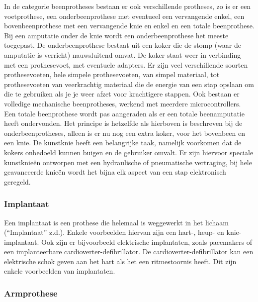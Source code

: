 In de categorie beenprotheses bestaan er ook verschillende protheses, zo
is er een voetprothese, een onderbeenprothese met eventueel een
vervangende enkel, een bovenbeenprothese met een vervangende knie en
enkel en een totale beenprothese. Bij een amputatie onder de knie wordt
een onderbeenprothese het meeste toegepast. De onderbeenprothese bestaat
uit een koker die de stomp (waar de amputatie is verricht) nauwsluitend
omvat. De koker staat weer in verbinding met een prothesevoet, met
eventuele adapters. Er zijn veel verschillende soorten prothesevoeten,
hele simpele prothesevoeten, van simpel materiaal, tot prothesevoeten
van veerkrachtig materiaal die de energie van een stap opslaan om die te
gebruiken als je je weer afzet voor krachtigere stappen. Ook bestaan er
volledige mechanische beenprotheses, werkend met meerdere
microcontrollers. Een totale beenprothese wordt pas aangeraden als er
een totale beenamputatie heeft ondervonden. Het principe is hetzelfde
als hierboven is beschreven bij de onderbeenprotheses, alleen is er nu
nog een extra koker, voor het bovenbeen en een knie. De kunstknie heeft
een belangrijke taak, namelijk voorkomen dat de kokers onbedoeld kunnen
buigen en de gebruiker omvalt. Er zijn hiervoor speciale kunstknieën
ontworpen met een hydraulische of pneumatische vertraging, bij hele
geavanceerde knieën wordt het bijna elk aspect van een stap elektronisch
geregeld.

\hypertarget{implantaat}{%
\subsubsection*{Implantaat}\label{implantaat}}

Een implantaat is een prothese die helemaal is weggewerkt in het lichaam
(``Implantaat'' z.d.). Enkele voorbeelden hiervan zijn een hart-, heup-
en knie-implantaat. Ook zijn er bijvoorbeeld elektrische implantaten,
zoals pacemakers of een implanteerbare cardioverter-defibrillator. De
cardioverter-defibrillator kan een elektrische schok geven aan het hart
als het een ritmestoornis heeft. Dit zijn enkele voorbeelden van
implantaten.

\hypertarget{armprothese}{%
\subsubsection*{Armprothese}\label{armprothese}}

